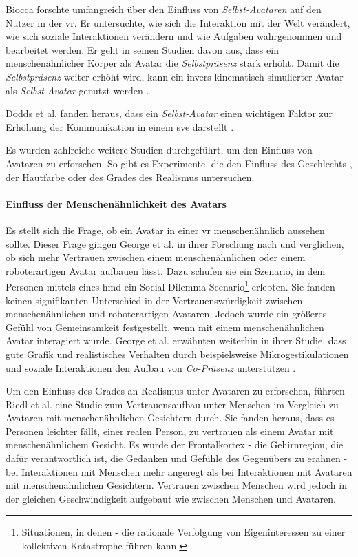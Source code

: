 \documentclass[a4paper,11pt]{article}%
\renewcommand{\\}{\vspace*{0.5\baselineskip} \newline}
\begin{document}
Biocca \citep[S. 421-427]{construal2014connected} forschte umfangreich über den Einfluss von \textit{Selbst-Avataren} auf den Nutzer in der \ac{vr}. Er untersuchte, wie sich die Interaktion mit der Welt verändert, wie sich soziale Interaktionen verändern und wie Aufgaben wahrgenommen und bearbeitet werden.
Er geht in seinen Studien davon aus, dass ein menschenähnlicher Körper als Avatar die \textit{Selbstpräsenz} stark erhöht. Damit die \textit{Selbstpräsenz} weiter erhöht wird, kann ein invers kinematisch simulierter Avatar als \textit{Selbst-Avatar} genutzt werden \citep[S. 421-427]{construal2014connected}.

Dodds et al. fanden heraus, dass ein \textit{Selbst-Avatar} einen wichtigen Faktor zur Erhöhung der Kommunikation in einem \ac{sve} darstellt \citep[S. 1-11]{dodds2011talk}.

Es wurden zahlreiche weitere Studien durchgeführt, um den Einfluss von Avataren zu erforschen. So gibt es Experimente, die den Einfluss des Geschlechts \cite{slater2010first}, der Hautfarbe \cite{peck2013putting} oder des Grades des Realismus \cite{roth2016avatar} untersuchen.

\label{AvatarTrust}
\paragraph{Einfluss der Menschenähnlichkeit des Avatars}
Es stellt sich die Frage, ob ein Avatar in einer \ac{vr} menschenähnlich aussehen sollte. Dieser Frage gingen George et al. \citep{george2018trusting} in ihrer Forschung nach und verglichen, ob sich mehr Vertrauen zwischen einem menschenähnlichen oder einem roboterartigen Avatar aufbauen lässt.
Dazu schufen sie ein Szenario, in dem Personen mittels eines \ac{hmd} ein Social-Dilemma-Scenario\footnote{Situationen, in denen - die rationale Verfolgung von Eigeninteressen zu einer kollektiven Katastrophe führen kann.} erlebten. Sie fanden keinen signifikanten Unterschied in der Vertrauenswürdigkeit zwischen menschenähnlichen und roboterartigen Avataren. Jedoch wurde ein größeres Gefühl von Gemeinsamkeit festgestellt, wenn mit einem menschenähnlichen Avatar interagiert wurde.
George et al. erwähnten weiterhin in ihrer Studie, dass gute Grafik und realistisches Verhalten durch beispielsweise Mikrogestikulationen und soziale Interaktionen den Aufbau von \textit{Co-Präsenz} unterstützen \citep{george2018trusting}.

Um den Einfluss des Grades an Realismus unter Avataren zu erforschen, führten Riedl et al. \citep{riedl2014trusting} eine Studie zum Vertrauensaufbau unter Menschen im Vergleich zu Avataren mit menschenähnlichen Gesichtern durch. Sie fanden heraus, dass es Personen leichter fällt, einer realen Person, zu vertrauen als einem Avatar mit menschenähnlichem Gesicht. Es wurde der Frontalkortex - die Gehirnregion, die dafür verantwortlich ist, die Gedanken und Gefühle des Gegenübers zu erahnen - bei Interaktionen mit Menschen mehr angeregt als bei Interaktionen mit Avataren mit menschenähnlichen Gesichtern.
Vertrauen zwischen Menschen wird jedoch in der gleichen Geschwindigkeit aufgebaut wie zwischen Menschen und Avataren.
\end{document}
